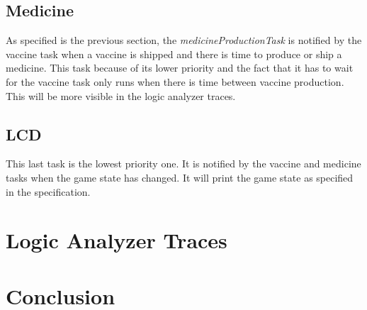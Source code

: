 \documentclass[a4paper, twoside, 12pt]{article}
\begin{document}
\subsection{Medicine}
As specified is the previous section, the \textit{medicineProductionTask} is notified by
the vaccine task when a vaccine is shipped and there is time to produce or ship a medicine.
This task because of its lower priority and the fact that it has to wait for the vaccine task
only runs when there is time between vaccine production.\\
This will be more visible in the logic analyzer traces.

\subsection{LCD}
This last task is the lowest priority one. It is notified by the vaccine and medicine tasks
when the game state has changed. It will print the game state as specified in the
specification.

\section{Logic Analyzer Traces}

\section{Conclusion}

\nocite{*}
\end{document}
